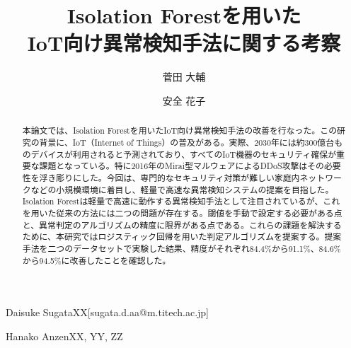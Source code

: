 \documentclass{css}
\begin{document}

\title{Isolation Forestを用いた\\IoT向け異常検知手法に関する考察}



\author{菅田 大輔}{Daisuke Sugata}{XX}[sugata.d.aa@m.titech.ac.jp]
\author{安全 花子}{Hanako Anzen}{XX, YY, ZZ}



\begin{abstract}
    本論文では、Isolation Forestを用いたIoT向け異常検知手法の改善を行なった。この研究の背景に、IoT（Internet of Things）の普及がある。実際、2030年には約300億台ものデバイスが利用されると予測されており、すべてのIoT機器のセキュリティ確保が重要な課題となっている。特に2016年のMirai型マルウェアによるDDoS攻撃はその必要性を浮き彫りにした。今回は、専門的なセキュリティ対策が難しい家庭内ネットワークなどの小規模環境に着目し、軽量で高速な異常検知システムの提案を目指した。Isolation Forestは軽量で高速に動作する異常検知手法として注目されているが、これを用いた従来の方法には二つの問題が存在する。閾値を手動で設定する必要がある点と、異常判定のアルゴリズムの精度に限界がある点である。これらの課題を解決するために、本研究ではロジスティック回帰を用いた判定アルゴリズムを提案する。提案手法を二つのデータセットで実験した結果、精度がそれぞれ84.4\%から91.1\%、84.6\%から94.5\%に改善したことを確認した。

\end{abstract}
\end{document}
